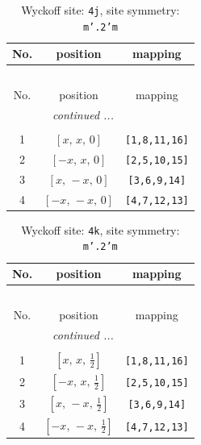 \documentclass[fleqn,8pt]{jsarticle}
\begin{document}
\begin{longtable}{ccc}
\caption{Wyckoff site: {\tt 4j}, site symmetry: {\tt m'.2'm}}
 \\
 \hline \hline
No. & position & mapping \\ \hline \endfirsthead

\multicolumn{2}{l}{\tablename\ \thetable{}} \\
 \hline \hline
No. & position & mapping \\ \hline \endhead

 \hline \hline
\multicolumn{2}{r}{\footnotesize\it continued ...} \\ \endfoot

 \hline \hline
\multicolumn{2}{r}{} \\ \endlastfoot

1 & $\left[ x,\, x,\, 0 \right]$ & {\tt [1,8,11,16]} \\ \hline
2 & $\left[ - x,\, x,\, 0 \right]$ & {\tt [2,5,10,15]} \\ \hline
3 & $\left[ x,\, - x,\, 0 \right]$ & {\tt [3,6,9,14]} \\ \hline
4 & $\left[ - x,\, - x,\, 0 \right]$ & {\tt [4,7,12,13]} \\
\end{longtable}
\renewcommand{\arraystretch}{1.2}
\begin{longtable}{ccc}
\caption{Wyckoff site: {\tt 4k}, site symmetry: {\tt m'.2'm}}
 \\
 \hline \hline
No. & position & mapping \\ \hline \endfirsthead

\multicolumn{2}{l}{\tablename\ \thetable{}} \\
 \hline \hline
No. & position & mapping \\ \hline \endhead

 \hline \hline
\multicolumn{2}{r}{\footnotesize\it continued ...} \\ \endfoot

 \hline \hline
\multicolumn{2}{r}{} \\ \endlastfoot

1 & $\left[ x,\, x,\, \frac{1}{2} \right]$ & {\tt [1,8,11,16]} \\ \hline
2 & $\left[ - x,\, x,\, \frac{1}{2} \right]$ & {\tt [2,5,10,15]} \\ \hline
3 & $\left[ x,\, - x,\, \frac{1}{2} \right]$ & {\tt [3,6,9,14]} \\ \hline
4 & $\left[ - x,\, - x,\, \frac{1}{2} \right]$ & {\tt [4,7,12,13]} \\
\end{longtable}
\end{document}

